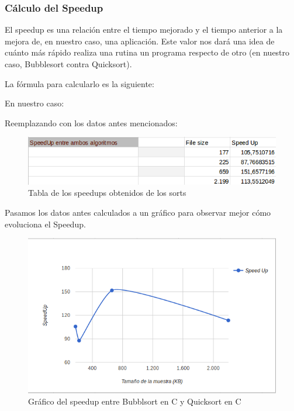 \documentclass[a4paper,10pt]{article}
\begin{document}
\newpage
\subsubsection{C\'alculo del Speedup}
El speedup es una relaci\'on entre el tiempo mejorado y el tiempo anterior a la mejora de, en nuestro caso, una aplicaci\'on. Este valor nos dar\'a una idea de cu\'anto m\'as r\'apido realiza una rutina un programa respecto de otro (en nuestro caso, Bubblesort contra Quicksort).

La f\'ormula para calcularlo es la siguiente:
\begin{center}
\end{center}

\medskip
En nuestro caso:

\begin{center}
\end{center}


\bigskip
Reemplazando con los datos antes mencionados:

\begin{figure}[h!]
	\centering
	\includegraphics[scale=0.7]{./recursos/SpeedUpAlgoritmos.png}
	\caption{Tabla de los speedups obtenidos de los sorts}
\end{figure}

\bigskip
Pasamos los datos antes calculados a un gr\'afico para observar mejor c\'omo evoluciona el Speedup.
\begin{figure}[h!]
	\centering
	\includegraphics[scale=0.7]{./recursos/speedUpMuestra.png}
	\caption{Gr\'afico del speedup entre Bubblsort en C y Quicksort en C}
\end{figure}
\end{document}
